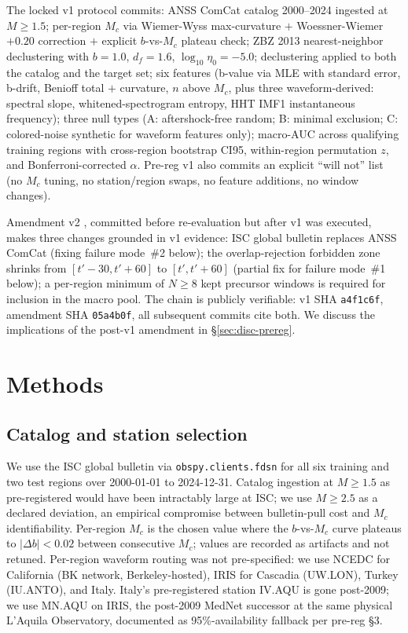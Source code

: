 \documentclass[11pt]{article}
\begin{document}
The locked v1 protocol \citep{loftus2026prereg} commits: ANSS ComCat
catalog 2000--2024 ingested at $M{\ge}1.5$; per-region $M_c$ via
Wiemer-Wyss \citep{wiemer2000} max-curvature $+$ Woessner-Wiemer
\citep{woessner2005} $+0.20$ correction $+$ explicit $b$-vs-$M_c$
plateau check; ZBZ 2013 nearest-neighbor declustering
\citep{zaliapin2013} with $b{=}1.0$, $d_f{=}1.6$,
$\log_{10}\eta_0{=}{-}5.0$; declustering applied to both the catalog
and the target set; six features (b-value via \citealp{aki1965} MLE
with \citealp{shibolt1982} standard error, b-drift, Benioff total $+$
curvature, $n$ above $M_c$, plus three waveform-derived: spectral
slope, whitened-spectrogram entropy, HHT IMF1 instantaneous frequency);
three null types (A: aftershock-free random; B: minimal exclusion;
C: colored-noise synthetic for waveform features only); macro-AUC across
qualifying training regions with cross-region bootstrap CI95,
within-region permutation $z$, and Bonferroni-corrected $\alpha$. Pre-reg
v1 also commits an explicit ``will not'' list (no $M_c$ tuning, no
station/region swaps, no feature additions, no window changes).

Amendment v2 \citep{loftus2026pra2}, committed before re-evaluation but
after v1 was executed, makes three changes grounded in v1 evidence:
ISC global bulletin replaces ANSS ComCat (fixing failure mode~\#2
below); the overlap-rejection forbidden zone shrinks from
$[t'-30, t'+60]$ to $[t', t'+60]$ (partial fix for failure mode~\#1
below); a per-region minimum of $N{\ge}8$ kept precursor windows is
required for inclusion in the macro pool. The chain is publicly
verifiable: v1 SHA \texttt{a4f1c6f}, amendment SHA \texttt{05a4b0f},
all subsequent commits cite both. We discuss the implications of the
post-v1 amendment in \S\ref{sec:disc-prereg}.

\section{Methods}
\label{sec:methods}

\subsection{Catalog and station selection}
\label{sec:methods-catalog}

We use the ISC global bulletin via \texttt{obspy.clients.fdsn} for all
six training and two test regions over 2000-01-01 to 2024-12-31.
Catalog ingestion at $M{\ge}1.5$ as pre-registered would have been
intractably large at ISC; we use $M{\ge}2.5$ as a declared deviation,
an empirical compromise between bulletin-pull cost and $M_c$
identifiability. Per-region $M_c$ is the chosen value where the
$b$-vs-$M_c$ curve plateaus to $|\Delta b| < 0.02$ between consecutive
$M_c$; values are recorded as artifacts and not retuned. Per-region
waveform routing was not pre-specified: we use NCEDC for California
(BK network, Berkeley-hosted), IRIS for Cascadia (UW.LON), Turkey
(IU.ANTO), and Italy. Italy's pre-registered station IV.AQU is gone
post-2009; we use MN.AQU on IRIS, the post-2009 MedNet successor at
the same physical L'Aquila Observatory, documented as 95\%-availability
fallback per pre-reg \S 3.
\end{document}
